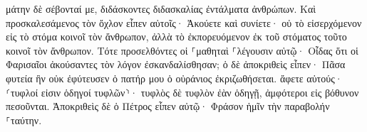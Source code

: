 \documentclass{openreader}
\begin{document}
μάτην δὲ σέβονταί με, διδάσκοντες διδασκαλίας ἐντάλματα ἀνθρώπων. 
Καὶ προσκαλεσάμενος τὸν ὄχλον εἶπεν αὐτοῖς· Ἀκούετε καὶ συνίετε· 
οὐ τὸ εἰσερχόμενον εἰς τὸ στόμα κοινοῖ τὸν ἄνθρωπον, ἀλλὰ τὸ ἐκπορευόμενον ἐκ τοῦ στόματος τοῦτο κοινοῖ τὸν ἄνθρωπον. 
Τότε προσελθόντες οἱ ⸀μαθηταὶ ⸀λέγουσιν αὐτῷ· Οἶδας ὅτι οἱ Φαρισαῖοι ἀκούσαντες τὸν λόγον ἐσκανδαλίσθησαν; 
ὁ δὲ ἀποκριθεὶς εἶπεν· Πᾶσα φυτεία ἣν οὐκ ἐφύτευσεν ὁ πατήρ μου ὁ οὐράνιος ἐκριζωθήσεται. 
ἄφετε αὐτούς· ⸂τυφλοί εἰσιν ὁδηγοί τυφλῶν⸃· τυφλὸς δὲ τυφλὸν ἐὰν ὁδηγῇ, ἀμφότεροι εἰς βόθυνον πεσοῦνται. 
Ἀποκριθεὶς δὲ ὁ Πέτρος εἶπεν αὐτῷ· Φράσον ἡμῖν τὴν παραβολήν ⸀ταύτην. 
\end{document}
